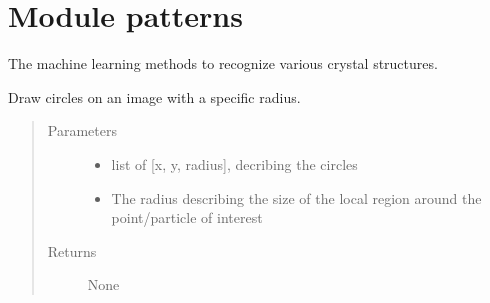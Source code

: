 \documentclass[letterpaper,10pt,english]{sphinxmanual}
\begin{document}
\label{\detokenize{index:module-mlpy.patterns}}

\chapter{Module patterns}
\label{\detokenize{index:module-patterns}}
The machine learning methods to recognize various crystal structures.

\label{\detokenize{index:module-3}}

\begin{fulllineitems}
\label{\detokenize{index:mlpy.patterns.compute_lindemann_parameter}}
Draw circles on an image with a specific radius.
\begin{quote}\begin{description}
\item[{Parameters}] \leavevmode\begin{itemize}
\item {} 
 \textendash{} list of {[}x, y, radius{]}, decribing the circles

\item {} 
 \textendash{} The radius describing the size of the local region around the point/particle of interest

\end{itemize}

\item[{Returns}] \leavevmode
None

\end{description}\end{quote}

\end{fulllineitems}

\label{\detokenize{index:module-mlpy.mio}}
\end{document}

